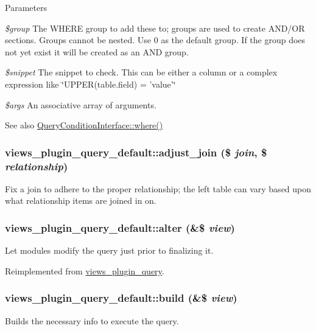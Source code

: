 \begin{DoxyParams}{Parameters}
\item[{\em \$group}]The WHERE group to add these to; groups are used to create AND/OR sections. Groups cannot be nested. Use 0 as the default group. If the group does not yet exist it will be created as an AND group. \item[{\em \$snippet}]The snippet to check. This can be either a column or a complex expression like \char`\"{}UPPER(table.field) = 'value'\char`\"{} \item[{\em \$args}]An associative array of arguments.\end{DoxyParams}
\begin{DoxySeeAlso}{See also}
\hyperlink{interfaceQueryConditionInterface_a42c03c74dd81ef6d77041e67ec12e735}{QueryConditionInterface::where()} 
\end{DoxySeeAlso}
\hypertarget{classviews__plugin__query__default_ac006f3847c96aa588b08b1072c36f939}{
\subsubsection[{adjust\_\-join}]{\setlength{\rightskip}{0pt plus 5cm}views\_\-plugin\_\-query\_\-default::adjust\_\-join (\$ {\em join}, \/  \$ {\em relationship})}}
\label{classviews__plugin__query__default_ac006f3847c96aa588b08b1072c36f939}
Fix a join to adhere to the proper relationship; the left table can vary based upon what relationship items are joined in on. \hypertarget{classviews__plugin__query__default_aeff774a83f61292070594afc26f7a3e6}{
\subsubsection[{alter}]{\setlength{\rightskip}{0pt plus 5cm}views\_\-plugin\_\-query\_\-default::alter (\&\$ {\em view})}}
\label{classviews__plugin__query__default_aeff774a83f61292070594afc26f7a3e6}
Let modules modify the query just prior to finalizing it. 

Reimplemented from \hyperlink{classviews__plugin__query_a19995bd24c67d383d8f6393b19a1ebfe}{views\_\-plugin\_\-query}.\hypertarget{classviews__plugin__query__default_af0d7dc2d4f1ac47d99b153a7734e4a96}{
\subsubsection[{build}]{\setlength{\rightskip}{0pt plus 5cm}views\_\-plugin\_\-query\_\-default::build (\&\$ {\em view})}}
\label{classviews__plugin__query__default_af0d7dc2d4f1ac47d99b153a7734e4a96}
Builds the necessary info to execute the query. 


